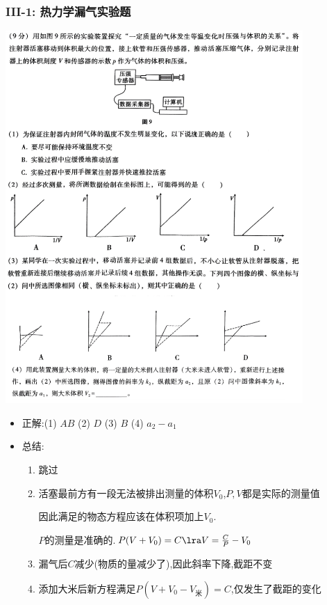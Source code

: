\documentclass{article}
\begin{document}
\vspace{2em}

\subsubsection{III-1: 热力学漏气实验题}
\includegraphics[width=0.85\textwidth,keepaspectratio]{./pictures/3.5-5.png}

\begin{itemize}
    \item 正解:\quad (1) $AB$ \hspace{2em} (2) $D$ \hspace{2em}  (3) $B$ \hspace{2em}  (4) $a_{2} - a_{1}$
    \item 总结:\quad

          \hspace{2.5em}\begin{minipage}{0.85\textwidth}
              \begin{enumerate}[label = (\arabic*)]
                  \item 跳过
                  \item 活塞最前方有一段无法被排出测量的体积$V_{0}$,$P,V$都是实际的测量值

                        因此满足的物态方程应该在体积项加上$V_{0}$.

                        $P$的测量是准确的.$P(V+V_{0}) = C \lra V = \frac{C}{P} - V_{0}$
                  \item 漏气后$C$减少(物质的量减少了),因此斜率下降,截距不变
                  \item 添加大米后新方程满足$P(V + V_{0} - V_{\text{米}}) = C$,仅发生了截距的变化
              \end{enumerate}
          \end{minipage}
\end{itemize}
\end{document}
